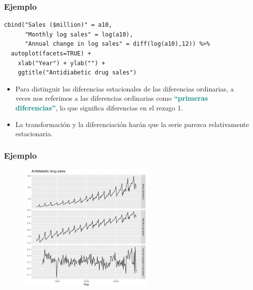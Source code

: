 \documentclass[10pt]{beamer}
\begin{document}





\begin{frame}[fragile]
\frametitle{Ejemplo}


\lstset{language=r,label= ,caption= ,captionpos=b,numbers=none}
\begin{lstlisting}
cbind("Sales ($million)" = a10,
      "Monthly log sales" = log(a10),
      "Annual change in log sales" = diff(log(a10),12)) %>%
  autoplot(facets=TRUE) +
    xlab("Year") + ylab("") +
    ggtitle("Antidiabetic drug sales")
\end{lstlisting}

\pause

\vspace{4mm}

\begin{itemize}
\item Para distinguir las diferencias estacionales de las diferencias ordinarias, a veces nos referimos a las diferencias ordinarias como \textcolor{teal}{\textbf{``primeras diferencias''}}, lo que significa diferencias en el rezago 1.

\item La transformación y la diferenciación harán que la serie parezca relativamente estacionaria.
\end{itemize}




\end{frame}





\begin{frame}[fragile]
\frametitle{Ejemplo}



\begin{figure}
\begin{center}
    \includegraphics[width=0.6\textwidth]{Imagen7.JPG}
\end{center}
\end{figure}



\end{frame}
\end{document}
